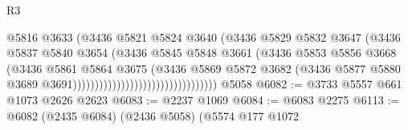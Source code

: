 \begin{lexlean}{R3}
\begin{coremodule}
                                                      @5816
                                                      @3633
                                                      (@3436
                                                        @5821
                                                        @5824
                                                        @3640
                                                        (@3436
                                                          @5829
                                                          @5832
                                                          @3647
                                                          (@3436
                                                            @5837
                                                            @5840
                                                            @3654
                                                            (@3436
                                                              @5845
                                                              @5848
                                                              @3661
                                                              (@3436
                                                                @5853
                                                                @5856
                                                                @3668
                                                                (@3436
                                                                  @5861
                                                                  @5864
                                                                  @3675
                                                                  (@3436
                                                                    @5869
                                                                    @5872
                                                                    @3682
                                                                    (@3436
                                                                      @5877
                                                                      @5880
                                                                      @3689
                                                                      @3691)))))))))))))))))))))))))))))))))
    @5058
@6082 := @3733 @5557 @661 @1073 @2626 @2623
@6083 := @2237 @1069
@6084 := @6083 @2275
@6113 := @6082
    (@2435 @6084)
    (@2436 @5058)
    (@5574
      @177
      @1072

\end{coremodule}
\end{lexlean}

